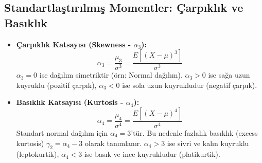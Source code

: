 \documentclass[12pt,a4paper]{article}
\begin{document}
\subsection{Standartlaştırılmış Momentler: Çarpıklık ve Basıklık}
\begin{itemize}
    \item \textbf{Çarpıklık Katsayısı (Skewness - $\alpha_3$):}
    \begin{equation}
        \alpha_3 = \frac{\mu_3}{\sigma^3} = \frac{E\left[(X - \mu)^3\right]}{\sigma^3}
    \end{equation}
    $\alpha_3 = 0$ ise dağılım simetriktir (örn: Normal dağılım). $\alpha_3 > 0$ ise sağa uzun kuyruklu (pozitif çarpık), $\alpha_3 < 0$ ise sola uzun kuyrukludur (negatif çarpık).

    \item \textbf{Basıklık Katsayısı (Kurtosis - $\alpha_4$):}
    \begin{equation}
        \alpha_4 = \frac{\mu_4}{\sigma^4} = \frac{E\left[(X - \mu)^4\right]}{\sigma^4}
    \end{equation}
    Standart normal dağılım için $\alpha_4 = 3$'tür. Bu nedenle fazlalık basıklık (excess kurtosis) $\gamma_2 = \alpha_4 - 3$ olarak tanımlanır. $\alpha_4 > 3$ ise sivri ve kalın kuyruklu (leptokurtik), $\alpha_4 < 3$ ise basık ve ince kuyrukludur (platikurtik).
\end{itemize}
\end{document}
